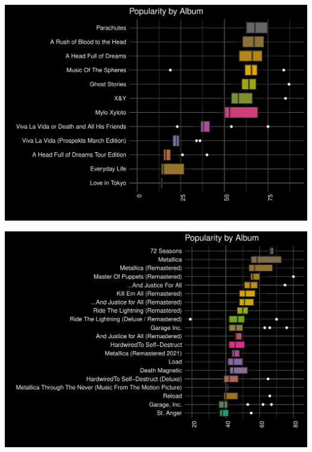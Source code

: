 \documentclass[12pt,preprint, authoryear]{elsarticle}
\let\origfigure\figure
\let\endorigfigure\endfigure
\renewenvironment{figure}[1][2] {
    \expandafter\origfigure\expandafter[H]
} {
    \endorigfigure
}
\numberwithin{equation}{section}
\numberwithin{figure}{section}
\numberwithin{table}{section}
\begin{document}
\begin{figure}

{\centering \includegraphics{README_files/figure-latex/unnamed-chunk-1-1} 

}

\caption{Coldplay's Popularity per Album.\label{Figure1}}\label{fig:unnamed-chunk-1}
\end{figure}

\begin{figure}

{\centering \includegraphics{README_files/figure-latex/unnamed-chunk-2-1} 

}

\caption{Metallica's Popularity per Album.\label{Figure2}}\label{fig:unnamed-chunk-2}
\end{figure}
\end{document}
